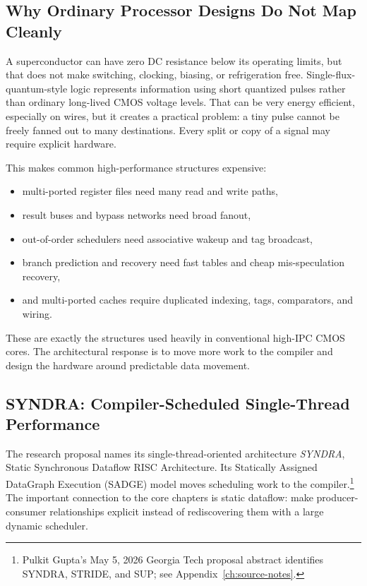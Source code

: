 \subsection{Why Ordinary Processor Designs Do Not Map Cleanly}\label{subsec:appd-sc-constraints}
A superconductor can have zero DC resistance below its operating limits, but that does not make switching, clocking, biasing, or refrigeration free.
Single-flux-quantum-style logic represents information using short quantized pulses rather than ordinary long-lived CMOS voltage levels.
That can be very energy efficient, especially on wires, but it creates a practical problem: a tiny pulse cannot be freely fanned out to many destinations.
Every split or copy of a signal may require explicit hardware.

This makes common high-performance structures expensive:
\begin{itemize}
    \item multi-ported register files need many read and write paths,
    \item result buses and bypass networks need broad fanout,
    \item out-of-order schedulers need associative wakeup and tag broadcast,
    \item branch prediction and recovery need fast tables and cheap mis-speculation recovery,
    \item and multi-ported caches require duplicated indexing, tags, comparators, and wiring.
\end{itemize}
These are exactly the structures used heavily in conventional high-IPC CMOS cores.
The architectural response is to move more work to the compiler and design the hardware around predictable data movement.

\subsection{SYNDRA: Compiler-Scheduled Single-Thread Performance}\label{subsec:appd-syndrome}
The research proposal names its single-thread-oriented architecture \textit{SYNDRA}, Static Synchronous Dataflow RISC Architecture.
Its Statically Assigned DataGraph Execution (SADGE) model moves scheduling work to the compiler.\footnote{Pulkit Gupta's May 5, 2026 Georgia Tech proposal abstract identifies SYNDRA, STRIDE, and SUP; see Appendix~\ref{ch:source-notes}.}
The important connection to the core chapters is static dataflow: make producer-consumer relationships explicit instead of rediscovering them with a large dynamic scheduler.

